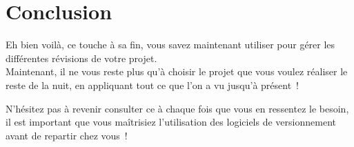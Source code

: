 \chapter{Conclusion}

Eh bien voilà, ce \tp{} touche à sa fin, vous savez maintenant utiliser \svn{} pour gérer les différentes révisions de votre projet.\\

Maintenant, il ne vous reste plus qu'à choisir le projet que vous voulez réaliser le reste de la nuit, en appliquant tout ce que l'on a vu jusqu'à présent~!

N'hésitez pas à revenir consulter ce \tp{} à chaque fois que vous en ressentez le besoin, il est important que vous maîtrisiez l'utilisation des logiciels de versionnement avant de repartir chez vous~!